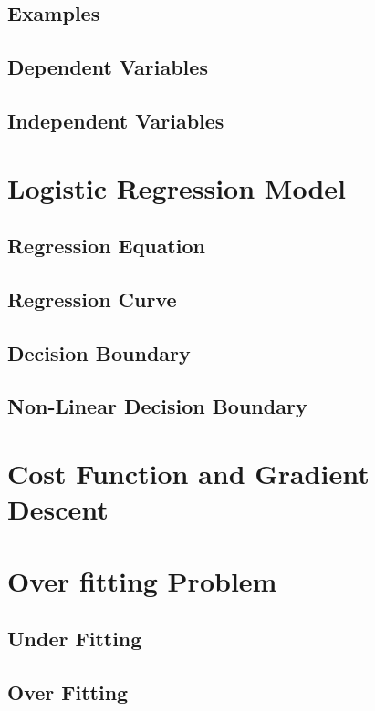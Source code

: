 \documentclass[conference]{IEEEtran}
\begin{document}
\subsection{Examples}

\subsection{Dependent Variables}

\subsection{Independent Variables}


\section{Logistic Regression Model}

\subsection{Regression Equation}

\subsection{Regression Curve}
\subsection{Decision Boundary}
\subsection{Non-Linear Decision Boundary}

\section{Cost Function and Gradient Descent}

\section{Over fitting Problem}
\subsection{Under Fitting}
\subsection{Over Fitting}
\end{document}
